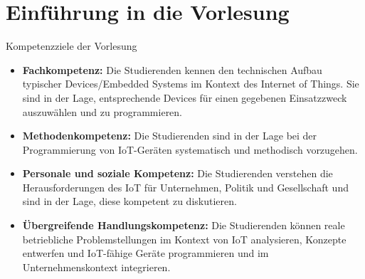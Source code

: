 \section{Einführung in die Vorlesung}

\begin{frame}{Kompetenzziele der Vorlesung}
    \begin{itemize}
        \item \textbf{Fachkompetenz:} Die Studierenden kennen den
        \textcolor{NavyBlue}{technischen Aufbau typischer Devices/Embedded Systems}
        im Kontext des Internet of Things. Sie sind in der Lage, entsprechende Devices
        für einen gegebenen Einsatzzweck auszuwählen und zu programmieren.
        \medskip

        \item \textbf{Methodenkompetenz:} Die Studierenden sind in der Lage
        bei der Programmierung von IoT-Geräten systematisch und methodisch vorzugehen.
        \medskip

        \item \textbf{Personale und soziale Kompetenz:} Die Studierenden verstehen die Herausforderungen
        des IoT für Unternehmen, Politik und Gesellschaft und sind in der Lage, diese kompetent zu diskutieren.
        \medskip

        \item \textbf{Übergreifende Handlungskompetenz:} Die Studierenden können reale betriebliche
        Problemstellungen im Kontext von IoT analysieren, \textcolor{NavyBlue}{Konzepte entwerfen}
        und \textcolor{NavyBlue}{IoT-fähige Geräte programmieren} und im Unternehmenskontext integrieren.
        \medskip
    \end{itemize}
\end{frame}

